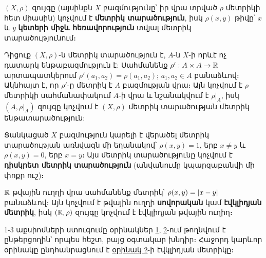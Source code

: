 \documentclass[./main.tex]{subfiles}
\begin{document}
\begin{definition} $(X,\rho)$ զույգը (այսինքն $X$ բազմությունը՝ իր վրա տրված $\rho$ մետրիկի հետ միասին) կոչվում է \textbf{մետրիկ տարածություն}, իսկ $\rho(x,y)$ թիվը՝ $x$ և $y$ \textbf{կետերի միջև հե\-ռա\-վո\-րութ\-յուն} տվյալ մետրիկ տարածությունում։
\end{definition}

\par Դիցուք $(X, \rho)$-ն մետրիկ տարածություն է, $A$-ն $X$-ի որևէ ոչ դատարկ ենթաբազ\-մու\-թյուն է: Սահմանենք $\rho': A \times A \to \mathbb{R}$ արտապատկերում $\rho'(a_1, a_2) = \rho(a_1, a_2)$; $a_1, a_2 \in A$ բանաձևով։ Ակնհայտ է, որ $\rho'$-ը մետրիկ է $A$ բազմության վրա։ Այն կոչվում է $\rho$ մետրիկի սահմանափակում $A$-ի վրա և նշանակվում է $\left.\rho\right|_A$, իսկ $(A, \left.\rho\right|_A)$ զույգը կոչվում է $(X, \rho)$ մետրիկ տարածության մետրիկ ենթատարածություն:

\begin{example}\label{ch7ex1}
Ցանկացած $X$ բազմություն կարելի է վերածել մետ\-րիկ տա\-րա\-ծու\-թյան առնվազն մի եղանակով՝ $\rho(x,y)=1$, երբ $x \neq y$ և $\rho(x,y)=0$, երբ $x=y$։ Այս մետրիկ տարածությունը կոչվում է \textbf{դիսկրետ մետրիկ տարածություն} (անվանումը կպարզաբանվի մի փոքր ուշ)։
\end{example}


\begin{example}\label{ch7ex2}
$\mathbb{R}$ թվային ուղղի վրա սահմանենք մետրիկ՝ $\rho(x,y)= \lvert x-y\rvert$ բանա\-ձևով։ Այն կոչվում է թվային ուղղի \textbf{սովորական} կամ \textbf{էվկլիդյան մետրիկ}, իսկ $   (\mathbb{R}, \rho)$ զույգը կոչվում է էվկլիդյան թվային ուղիղ։
\end{example}


\par 1-3 աքսիոմների ստուգումը օրինակներ \hyperref[ch7ex1]{1}, \hyperref[ch7ex2]{2}-ում թողնվում է ընթերցողին՝ որպես հեշտ, բայց օգտակար խնդիր։ Հաջորդ կարևոր օրինակը ընդհանրացնում է \hyperref[ch7ex2]{օրինակ 2}-ի էվկլիդ\-յան մետրիկը։
\end{document}
